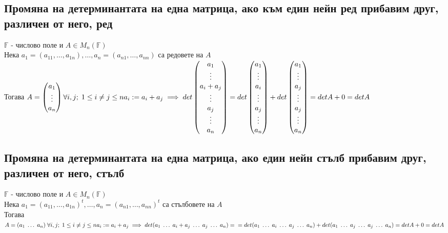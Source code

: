\documentclass{article}
\newcommand{\F}{\mathbb{F}}
\newcommand{\forallij}{\forall i, j; \; 1 \leq i \neq j \leq n}
\newcommand{\arows}{Нека \(a_1 = (a_{11}, \dots, a_{1n}), \dots, a_n = (a_{n1}, \dots, a_{nn})\) са редовете на \(A\)\\ Тогава }
\newcommand{\acols}{Нека \(a_1 = (a_{11}, \dots, a_{1n})^t, \dots, a_n = (a_{n1}, \dots, a_{nn})^t\) са стълбовете на \(A\)\\ Тогава }
\newcommand{\leta}{\(\F\) - числово поле и \(A \in M_n(\F)\)}
\begin{document}
    \subsection{Промяна на детерминантата на една матрица, ако към един нейн ред прибавим друг, различен от него, ред}
    \leta\\
    \arows \(A = \begin{pmatrix} a_1\\ \vdots\\ a_n \end{pmatrix} \forallij\\
    a_i := a_i + a_j \implies det\begin{pmatrix} a_1\\ \vdots\\ a_i + a_j\\ \vdots\\ a_j\\ \vdots\\ a_n \end{pmatrix}
    = det\begin{pmatrix} a_1\\ \vdots\\ a_i\\ \vdots\\ a_j\\ \vdots\\ a_n \end{pmatrix} +  det\begin{pmatrix} a_1\\ \vdots\\ a_j\\ \vdots\\ a_j\\ \vdots\\ a_n \end{pmatrix}
    = detA + 0 = detA\)
    \subsection{Промяна на детерминантата на една матрица, ако един нейн стълб прибавим друг, различен от него, стълб}
    \leta\\
    \acols \(A = (a_1 \; \dots \; a_n) \; \forallij\\
    a_i := a_i + a_j \implies det(a_1 \; \dots \; a_i + a_j \; \dots \; a_j \; \dots \; a_n) =\\
    = det(a_1 \; \dots \; a_i \; \dots \; a_j \; \dots \; a_n) + det(a_1 \; \dots \; a_j \; \dots \; a_j \; \dots \; a_n) = detA + 0 = detA\)
\end{document}
